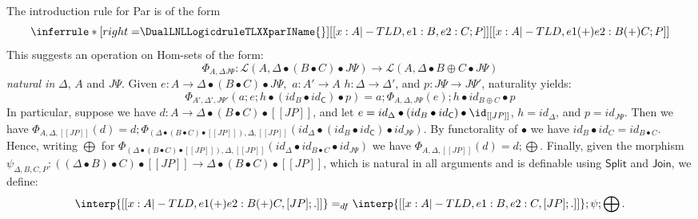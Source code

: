 The introduction rule for Par is of the form 
\[
\inferrule* [right=$\DualLNLLogicdruleTLXXparIName{}$] {
  [[x : A |-TL D,e1 : B,e2 : C;P]]
}{[[x : A |-TL D,e1 (+) e2 : B (+) C;P]]}
\]
This suggests an operation on Hom-sets of the form:
$$
\Phi_{A, \Delta J\Psi}: \mathcal{L}(A, \Delta \bullet (B \bullet C) \bullet J\Psi) \rightarrow 
\mathcal{L}(A, \Delta\bullet B\oplus C \bullet J\Psi)
$$
{\em natural in} $\Delta$, $A$ and $J\Psi$. Given 
$e: A\rightarrow \Delta \bullet (B\bullet C)\bullet J\Psi,$ $a: A' \rightarrow A$
 $h: \Delta\rightarrow\Delta'$, and  $p: J\Psi\rightarrow J\Psi'$, naturality yields:
$$
\Phi_{A', \Delta',J\Psi'}(a; e; h\bullet (id_B\bullet id_{\mathsf{C}}) \bullet p) = a; \Phi_{A, \Delta, J\Psi}(e); h\bullet id_{B\oplus C}\bullet p
$$
In particular, suppose we have $d: A \rightarrow \Delta\bullet (B\bullet C) \bullet [[J P]]$,
and let $e = id_{\Delta} \bullet (id_B \bullet id_{\mathsf{C}}) \bullet \id_{[[J P]]}$,
$h = id_{\Delta}$, and $p = id_{J\Psi}$. Then we have
$\Phi_{A, \Delta, [[J P]]}(d) = d; \Phi_{(\Delta \bullet (B \bullet C) \bullet [[J P]]),\Delta,[[J P]]} (id_{\Delta}\bullet (id_B \bullet id_{\mathsf{C}}) \bullet id_{J\Psi})$.
By functorality of $\bullet$ we have $id_{B}\bullet id_{C} = id_{B\bullet C}$. Hence, writing  
$\bigoplus$ for $\Phi_{(\Delta \bullet (B \bullet C) \bullet [[J P]]),\Delta,[[J P]]} (id_{\Delta}\bullet id_{B \bullet C} \bullet id_{J\Psi})$ we have 
$\Phi_{A, \Delta,[[J P]]}(d) = d; \bigoplus$. Finally, given the morphism $\psi_{\Delta,B,C,P} : ((\Delta \bullet B) \bullet C) \bullet [[J P]] \rightarrow \Delta \bullet (B \bullet C) \bullet [[J P]]$, which is natural in all arguments and is definable using $\mathsf{Split}$ and $\mathsf{Join}$, we define:
$$
\interp{[[x:A |-TL  D, e1 (+) e2 : B (+) C, [ J P ];. ]]} =_{df} \interp{[[x:A |-TL  D, e1 : B, e2 : C, [ J P ];. ]]};\psi;\bigoplus.
$$

\vspace{3ex}


